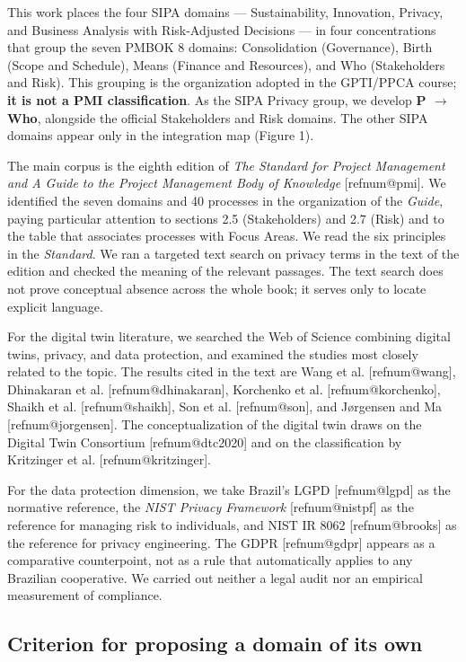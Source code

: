 \documentclass[12pt,a4paper,article,oneside,brazil,english]{abntex2}
\makeatletter
\newcommand{\refnum}[1]{\csname refnum@#1\endcsname}
\makeatother
\begin{document}
This work places the four SIPA domains — Sustainability, Innovation, Privacy, and Business Analysis with Risk-Adjusted Decisions — in four concentrations that group the seven PMBOK 8 domains: Consolidation (Governance), Birth (Scope and Schedule), Means (Finance and Resources), and Who (Stakeholders and Risk). This grouping is the organization adopted in the GPTI/PPCA course; \textbf{it is not a PMI classification}. As the SIPA Privacy group, we develop \textbf{P \ensuremath{\rightarrow} Who}, alongside the official Stakeholders and Risk domains. The other SIPA domains appear only in the integration map (Figure 1).

The main corpus is the eighth edition of \textit{The Standard for Project Management and A Guide to the Project Management Body of Knowledge} [\refnum{pmi}]. We identified the seven domains and 40 processes in the organization of the \textit{Guide}, paying particular attention to sections 2.5 (Stakeholders) and 2.7 (Risk) and to the table that associates processes with Focus Areas. We read the six principles in the \textit{Standard}. We ran a targeted text search on privacy terms in the text of the edition and checked the meaning of the relevant passages. The text search does not prove conceptual absence across the whole book; it serves only to locate explicit language.

For the digital twin literature, we searched the Web of Science combining digital twins, privacy, and data protection, and examined the studies most closely related to the topic. The results cited in the text are Wang et al. [\refnum{wang}], Dhinakaran et al. [\refnum{dhinakaran}], Korchenko et al. [\refnum{korchenko}], Shaikh et al. [\refnum{shaikh}], Son et al. [\refnum{son}], and Jørgensen and Ma [\refnum{jorgensen}]. The conceptualization of the digital twin draws on the Digital Twin Consortium [\refnum{dtc2020}] and on the classification by Kritzinger et al. [\refnum{kritzinger}].

For the data protection dimension, we take Brazil's LGPD [\refnum{lgpd}] as the normative reference, the \textit{NIST Privacy Framework} [\refnum{nistpf}] as the reference for managing risk to individuals, and NIST IR 8062 [\refnum{brooks}] as the reference for privacy engineering. The GDPR [\refnum{gdpr}] appears as a comparative counterpoint, not as a rule that automatically applies to any Brazilian cooperative. We carried out neither a legal audit nor an empirical measurement of compliance.
\subsection{Criterion for proposing a domain of its own}
\end{document}
